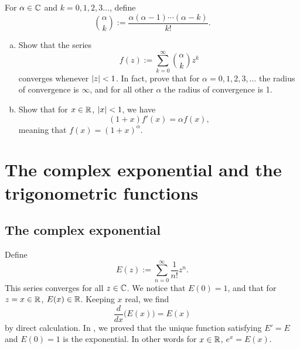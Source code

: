 \begin{exercise}
For $\alpha \in {\mathbb{C}}$ and $k=0,1,2,3\ldots$, define
\begin{equation*}
\binom{\alpha}{k} := \frac{\alpha(\alpha-1)\cdots(\alpha-k)}{k!} .
\end{equation*}
\begin{enumerate}[a)]
\item
Show that the series
\begin{equation*}
f(z) := \sum_{k=0}^\infty \binom{\alpha}{k} z^k
\end{equation*}
converges whenever $\left\lvert {z} \right\rvert < 1$.
In fact, prove that for $\alpha = 0,1,2,3,\ldots$ the radius of
convergence is $\infty$, and for all other $\alpha$
the radius of convergence is 1.
\item
Show that for $x \in {\mathbb{R}}$, $\left\lvert {x} \right\rvert < 1$, we have
\begin{equation*}
(1+x) f'(x) = \alpha f(x) ,
\end{equation*}
meaning that $f(x) = (1+x)^\alpha$.
\end{enumerate}
\end{exercise}


\sectionnewpage
\section{The complex exponential and the trigonometric functions}
\label{sec:complexexp}


\subsection{The complex exponential}

Define
\begin{equation*}
E(z) := \sum_{n=0}^\infty \frac{1}{n!} z^n .
\end{equation*}
This series converges for all $z \in {\mathbb{C}}$.   We notice that $E(0) = 1$,
and that for $z=x \in {\mathbb{R}}$, $E(x) \in {\mathbb{R}}$.  Keeping $x$ real, we find
\begin{equation*}
\frac{d}{dx} \bigl( E(x) \bigr) = E(x)
\end{equation*}
by direct calculation.
In , we proved that
the unique function satisfying $E' = E$ and
$E(0) = 1$ is the exponential.  In other words for $x \in {\mathbb{R}}$, $e^x = E(x)$.

